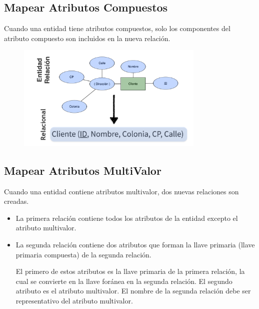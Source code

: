 \documentclass[12pt, fleqn]{report}                             %
\begin{document}
            \subsection{Mapear Atributos Compuestos}

                Cuando una entidad tiene atributos compuestos, solo los componentes del atributo
                compuesto son incluidos en la nueva relación.

                \begin{figure}[h]
                    \centering
                    \includegraphics[width=0.80\textwidth]{NormalizacionCompuesto}
                \end{figure}


            \clearpage
            \subsection{Mapear Atributos MultiValor}

                Cuando una entidad contiene atributos multivalor, dos nuevas relaciones son creadas.

                \begin{itemize}

                    \item
                        La primera relación contiene todos los atributos de la entidad excepto el
                        atributo multivalor.
                    \item
                        La segunda relación contiene dos atributos que forman la llave primaria
                        (llave primaria compuesta) de la segunda relación.

                        El primero de estos atributos es la llave primaria de la primera relación,
                        la cual se convierte en la llave foránea en la segunda relación.
                        El segundo atributo es el atributo multivalor.
                        El nombre de la segunda relación debe ser representativo del atributo multivalor.

                \end{itemize}  
\end{document}
